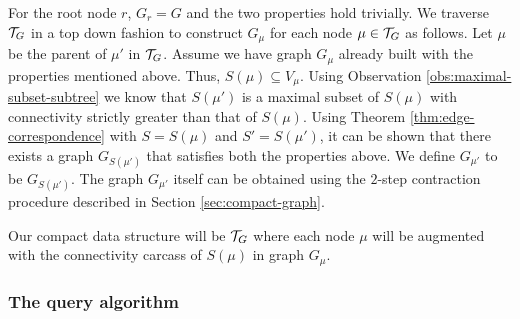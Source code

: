 For the root node $r$, $G_r=G$ and the two properties hold trivially.
We traverse ${\cal T}_G$ in a top down fashion to construct $G_\mu$ for each node $\mu \in {\cal T}_G$ as follows. Let $\mu$ be the parent of $\mu'$ in ${\cal T}_G$. Assume we have graph $G_{\mu}$ already built with the properties mentioned above. Thus, $S(\mu)\subseteq V_\mu$. Using Observation \ref{obs:maximal-subset-subtree} we know that $S(\mu')$ is a maximal subset of $S(\mu)$ with connectivity strictly greater than that of $S(\mu)$. Using Theorem \ref{thm:edge-correspondence} with $S=S(\mu)$ and $S'=S(\mu')$, it can be shown that there exists a graph $G_{S(\mu')}$ 
that satisfies both the properties above. We define $G_{\mu'}$ to be $G_{S(\mu')}$.
The graph $G_{\mu'}$ itself
can be obtained using the $2$-step contraction procedure described in Section \ref{sec:compact-graph}.



Our compact data structure will be ${\cal T}_G$ where each node $\mu$ will be augmented with the connectivity carcass of $S(\mu)$ in graph $G_\mu$. 

\subsubsection*{The query algorithm}

